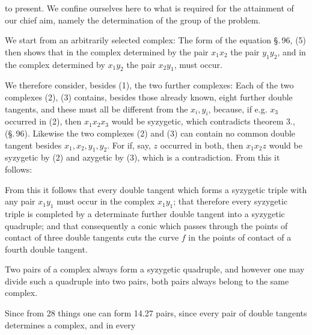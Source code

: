 to present. We confine ourselves here to what is required for the attainment of our chief aim, namely the determination of the  group of the problem.

We start from an arbitrarily selected  complex:
The form of the equation \S.\,96, (5) then shows that in the complex determined by the pair $x_1 x_2$ the pair $y_1 y_2$, and in the complex determined by $x_1 y_2$ the pair $x_2 y_1$, must occur.

We therefore consider, besides (1), the two further complexes:
Each of the two complexes (2), (3) contains, besides those already known, eight further double tangents, and these must all be different from the $x_i, y_i$, because, if e.g. $x_3$ occurred in (2), then $x_1 x_2 x_3$ would be syzygetic, which contradicts theorem 3., (\S.\,96). Likewise the two complexes (2) and (3) can contain no common double tangent besides $x_1, x_2, y_1, y_2$. For if, say, $z$ occurred in both, then $x_1 x_2 z$ would be syzygetic by (2) and azygetic by (3), which is a contradiction. From this it follows:


From this it follows that every double tangent which forms a syzygetic triple with any pair $x_1 y_1$ must occur in the complex $x_1 y_1$; that therefore every syzygetic triple is completed by a determinate further double tangent into a syzygetic quadruple; and that consequently a conic which passes through the points of contact of three double tangents cuts the curve $f$ in the points of contact of a fourth double tangent.

Two pairs of a complex always form a syzygetic quadruple, and however one may divide such a quadruple into two pairs, both pairs always belong to the same complex.

Since from 28 things one can form 14.27 pairs, since every pair of double tangents determines a complex, and in every
